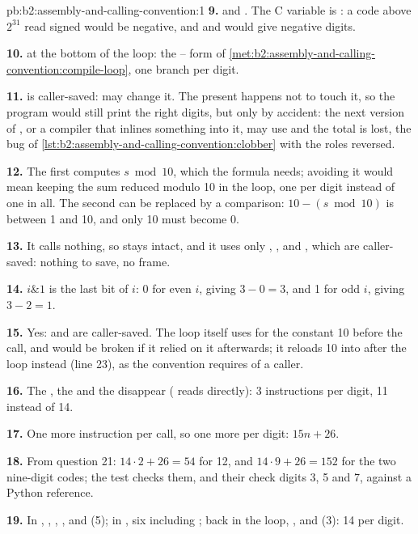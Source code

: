\begin{solution}{pb:b2:assembly-and-calling-convention:1}
\textbf{9.}  and . The C variable is : a code above $2^{31}$
read signed would be negative, and  and  would give negative digits.

\textbf{10.}  at the bottom of the loop: the -- form of
\cref{met:b2:assembly-and-calling-convention:compile-loop}, one branch per digit.

\textbf{11.}  is caller-saved:  may change it. The present  happens not to touch it,
so the program would still print the right digits, but only by accident: the next version of , or a
compiler that inlines something into it, may use  and the total is lost, the bug of
\cref{lst:b2:assembly-and-calling-convention:clobber} with the roles reversed.

\textbf{12.} The first  computes $s \bmod 10$, which the formula needs; avoiding it would mean keeping
the sum reduced modulo 10 in the loop, one  per digit instead of one in all. The second can be replaced by
a comparison: $10 - (s \bmod 10)$ is between 1 and 10, and only 10 must become 0.

\textbf{13.} It calls nothing, so  stays intact, and it uses only , ,  and
, which are caller-saved: nothing to save, no frame.

\textbf{14.} $i \mathbin{\&} 1$ is the last bit of $i$: 0 for even $i$, giving $3 - 0 = 3$, and 1 for odd $i$, giving
$3 - 2 = 1$.

\textbf{15.} Yes:  and  are caller-saved. The loop itself uses  for the constant 10 before
the call, and would be broken if it relied on it afterwards; it reloads 10 into  after the loop instead
(line 23), as the convention requires of a caller.

\textbf{16.} The , the  and the  disappear ( reads 
directly): 3 instructions per digit, 11 instead of 14.

\textbf{17.} One more instruction per call, so one more per digit: $15n + 26$.

\textbf{18.} From question 21: $14 \cdot 2 + 26 = 54$ for 12, and $14 \cdot 9 + 26 = 152$ for the two nine-digit codes;
the test checks them, and their check digits 3, 5 and 7, against a Python reference.

\textbf{19.} In , , , ,  and  (5); in , six
including ; back in the loop, ,  and  (3): 14 per digit.


\end{solution}
